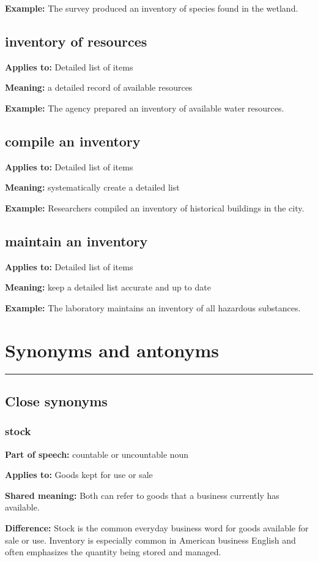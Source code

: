 \documentclass[11pt]{article}
\newcommand{\sectionrule}{\par\vspace{-0.5em}\noindent\textcolor{Accent}{\rule{\linewidth}{0.6pt}}\par}
\begin{document}
\textbf{Example:} The survey produced an inventory of species found in the wetland.

\subsection{inventory of resources}
\textbf{Applies to:} Detailed list of items

\textbf{Meaning:} a detailed record of available resources

\textbf{Example:} The agency prepared an inventory of available water resources.

\subsection{compile an inventory}
\textbf{Applies to:} Detailed list of items

\textbf{Meaning:} systematically create a detailed list

\textbf{Example:} Researchers compiled an inventory of historical buildings in the city.

\subsection{maintain an inventory}
\textbf{Applies to:} Detailed list of items

\textbf{Meaning:} keep a detailed list accurate and up to date

\textbf{Example:} The laboratory maintains an inventory of all hazardous substances.

\section{Synonyms and antonyms}
\sectionrule
\subsection{Close synonyms}
\subsubsection{stock}
\textbf{Part of speech:} countable or uncountable noun

\textbf{Applies to:} Goods kept for use or sale

\textbf{Shared meaning:} Both can refer to goods that a business currently has available.

\textbf{Difference:} Stock is the common everyday business word for goods available for sale or use. Inventory is especially common in American business English and often emphasizes the quantity being stored and managed.
\end{document}
